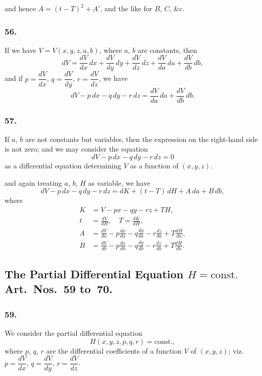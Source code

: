 \documentclass[12pt,a4paper]{article}
\theoremstyle{plain}
\begin{document}
\newpage
\setcounter{page}{137}

and hence $A = (t - T)^{2} + A'$, and the like for $B$, $C$, \&c.

\subsubsection*{56.}

If we have $V = V(x, y, z, a, b)$, where $a$, $b$ are constants, then
\[
dV = \frac{dV}{dx}\,dx + \frac{dV}{dy}\,dy + \frac{dV}{dz}\,dz + \frac{dV}{da}\,da + \frac{dV}{db}\,db,
\]
and if $p = \dfrac{dV}{dx}$, $q = \dfrac{dV}{dy}$, $r = \dfrac{dV}{dz}$, we have
\[
dV - p\,dx - q\,dy - r\,dz = \frac{dV}{da}\,da + \frac{dV}{db}\,db.
\]

\subsubsection*{57.}

If $a$, $b$ are not constants but variables, then the expression on the right-hand side is not zero; and we may consider the equation
\[
dV - p\,dx - q\,dy - r\,dz = 0
\]
as a differential equation determining $V$ as a function of $(x, y, z)$.

\newpage
\setcounter{page}{138}

and again treating $a$, $b$, $H$ as variable, we have
\[
dV - p\,dx - q\,dy - r\,dz = dK + (t - T)\,dH + A\,da + B\,db,
\]
where
\begin{align*}
K &= V - px - qy - rz + T H, \\
t &= \frac{dV}{dH}, \quad T = \frac{dK}{dH}, \\
A &= \frac{dV}{da} - p\frac{dx}{da} - q\frac{dy}{da} - r\frac{dz}{da} + T\frac{dH}{da}, \\
B &= \frac{dV}{db} - p\frac{dx}{db} - q\frac{dy}{db} - r\frac{dz}{db} + T\frac{dH}{db}.
\end{align*}

\subsection*{The Partial Differential Equation $H = \text{const.}$ Art.~Nos.~59 to~70.}

\subsubsection*{59.}

We consider the partial differential equation
\[
H(x, y, z, p, q, r) = \text{const.},
\]
where $p$, $q$, $r$ are the differential coefficients of a function $V$ of $(x, y, z)$; viz.~$p = \dfrac{dV}{dx}$, $q = \dfrac{dV}{dy}$, $r = \dfrac{dV}{dz}$.
\end{document}

